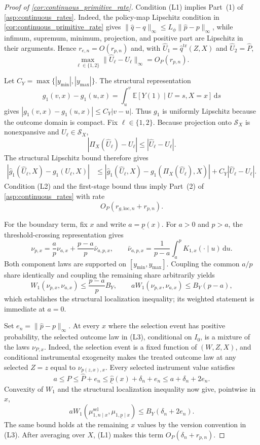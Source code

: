 \begin{proof}[Proof of \cref{cor:continuous_primitive_rate}]
Condition (L1) implies Part~(1) of \cref{asp:continuous_rates}. Indeed, the policy-map Lipschitz condition in \cref{cor:continuous_primitive_rate} gives $\|\hat q-q\|_\infty\le L_\phi\|\hat p-p\|_\infty$, while infimum, supremum, minimum, projection, and positive part are Lipschitz in their arguments. Hence $r_{e,n}=O(r_{p,n})$ and, with $\hat U_1=\hat q^{\mathrm{tr}}(Z,X)$ and $\hat U_2=\hat P$,
\[
    \max_{\ell\in\{1,2\}}\|\hat U_\ell-U_\ell\|_\infty
    =O_P(r_{p,n}).
\]

Let $C_Y=\max\{|y_{\min}|,|y_{\max}|\}$. The structural representation
\[
    g_1(v,x)-g_1(u,x)
    =\int_u^v\mathbb E[Y(1)\mid U=s,X=x]\,\mathrm ds
\]
gives $|g_1(v,x)-g_1(u,x)|\le C_Y|v-u|$. Thus $g_1$ is uniformly Lipschitz because the outcome domain is compact. Fix $\ell\in\{1,2\}$. Because projection onto $\mathcal S_X$ is nonexpansive and $U_\ell\in\mathcal S_X$,
\[
    |\Pi_X(\hat U_\ell)-U_\ell|
    \le |\hat U_\ell-U_\ell|.
\]
The structural Lipschitz bound therefore gives
\begin{align*}
    |\hat g_1(\hat U_\ell,X)-g_1(U_\ell,X)|
    &\le
      |\hat g_1(\hat U_\ell,X)
        -g_1(\Pi_X(\hat U_\ell),X)|
      +C_Y|\hat U_\ell-U_\ell|.
\end{align*}
Condition (L2) and the first-stage bound thus imply Part~(2) of \cref{asp:continuous_rates} with rate
\[
    O_P(r_{g,\mathrm{loc},n}+r_{p,n}).
\]

For the boundary term, fix $x$ and write $a=\underline p(x)$. For $a>0$ and $p>a$, the threshold-crossing representation gives
\[
    \nu_{p,x}
    =\frac ap\nu_{a,x}+\frac{p-a}{p}\bar\nu_{a,p,x},
    \qquad
    \bar\nu_{a,p,x}
    =\frac1{p-a}\int_a^p K_{1,x}(\mathord\cdot\mid u)\,\mathrm du .
\]
Both component laws are supported on $[y_{\min},y_{\max}]$. Coupling the common $a/p$ share identically and coupling the remaining share arbitrarily yields
\[
    W_1(\nu_{p,x},\nu_{a,x})
    \le \frac{p-a}{p}B_Y,
    \qquad
    aW_1(\nu_{p,x},\nu_{a,x})
    \le B_Y(p-a),
\]
which establishes the structural localization inequality; its weighted statement is immediate at $a=0$.

Set $e_n=\|\hat p-p\|_\infty$. At every $x$ where the selection event has positive probability, the selected outcome law in (L3), conditional on $I_0$, is a mixture of the laws $\nu_{P,x}$. Indeed, the selection event is a fixed function of $(W,Z,X)$, and conditional instrumental exogeneity makes the treated outcome law at any selected $Z=z$ equal to $\nu_{p(z,x),x}$. Every selected instrument value satisfies
\[
    a\le P\le \hat P+e_n
      \le \hat{\underline p}(x)+\delta_n+e_n
      \le a+\delta_n+2e_n .
\]
Convexity of $W_1$ and the structural localization inequality now give, pointwise in $x$,
\[
    aW_1\!\left(\mu^{\mathrm{sel}}_{1,n\mid x},
                   \mu_{1,\underline p\mid x}\right)
    \le B_Y(\delta_n+2e_n).
\]
The same bound holds at the remaining $x$ values by the version convention in (L3). After averaging over $X$, (L1) makes this term $O_P(\delta_n+r_{p,n})$.


\end{proof}
